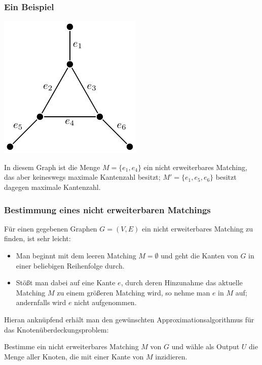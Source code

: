 \documentclass[smaller]{beamer}
\begin{document}
\begin{frame}
\frametitle{Ein Beispiel}
\begin{center}
 \includegraphics{fig61.pdf}
\end{center}

In diesem Graph ist die Menge $M = \big\{ e_1,e_4 \big\}$ ein nicht erweiterbares Matching, das aber keineswegs maximale Kantenzahl besitzt; $M' = \big\{ e_1,e_5,e_6 \big\}$ besitzt dagegen maximale Kantenzahl.
\end{frame}

\begin{frame}
\frametitle{Bestimmung eines nicht erweiterbaren Matchings}
Für einen gegebenen Graphen $G=(V,E)$ ein nicht erweiterbares Matching zu finden, ist sehr leicht: \\ \vspace*{0.2cm} 
\begin{itemize}
 \item Man beginnt mit dem leeren Matching $M = \emptyset$ und geht die Kanten von $G$ in einer beliebigen Reihenfolge durch. 
 \item Stößt man dabei auf eine Kante $e$, durch deren Hinzunahme das aktuelle Matching $M$ zu einem größeren Matching wird, so nehme man $e$ in $M$ auf; andernfalls wird $e$ nicht aufgenommen.
\end{itemize}

Hieran anknüpfend erhält man den gewünschten \alert{Approximationsalgorithmus für das Knotenüberdeckungsproblem:} \\ \vspace*{0.2cm}

\alert{Bestimme ein nicht erweiterbares Matching $M$ von $G$ und wähle als Output $U$ die Menge aller Knoten, die mit einer Kante von $M$ inzidieren.}
\end{frame}
\end{document}
